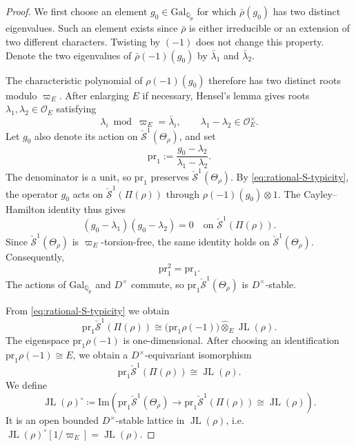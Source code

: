 \documentclass[11pt]{article}
\theoremstyle{definition}
\newcommand{\cO}{\mathcal O}
\newcommand{\JL}{\operatorname{JL}}
\begin{document}
\begin{proof}
We first choose an element $g_0\in\mathrm{Gal}_{\mathbb Q_p}$ for
which $\bar\rho(g_0)$ has two distinct eigenvalues.  Such an element exists since $\bar{\rho}$ is either irreducible or an extension of two different characters. 
Twisting by $(-1)$ does not change this property.  Denote
the two eigenvalues of $\bar\rho(-1)(g_0)$ by
$\bar\lambda_1$ and $\bar\lambda_2$.

The characteristic polynomial of $\rho(-1)(g_0)$ therefore has two
distinct roots modulo $\varpi_E$.  After enlarging $E$ if necessary,
Hensel's lemma gives roots $\lambda_1,\lambda_2\in\cO_E$ satisfying
\[
 \lambda_i\bmod\varpi_E=\bar\lambda_i,
 \qquad
 \lambda_1-\lambda_2\in\cO_E^\times.
\]
Let $g_0$ also denote its action on $\check{\mathcal S}^1(\Theta_\rho)$, and set
\[
 \mathrm{pr}_1:=\frac{g_0-\lambda_2}{\lambda_1-\lambda_2}.
\]
The denominator is a unit, so $\mathrm{pr}_1$ preserves
$\check{\mathcal S}^1(\Theta_\rho)$.  By \eqref{eq:rational-S-typicity}, the
operator $g_0$ acts on $\check{\mathcal S}^1(\Pi(\rho))$ through
$\rho(-1)(g_0)\otimes 1$.  The Cayley--Hamilton identity thus gives
\[
 (g_0-\lambda_1)(g_0-\lambda_2)=0
 \quad\text{on }\check{\mathcal S}^1(\Pi(\rho)).
\]
Since $\check{\mathcal S}^1(\Theta_\rho)$ is $\varpi_E$-torsion-free, the same
identity holds on $\check{\mathcal S}^1(\Theta_\rho)$.  Consequently,
\[
 \mathrm{pr}_1^2=\mathrm{pr}_1.
\]
The actions of $\mathrm{Gal}_{\mathbb Q_p}$ and $D^\times$ commute,
so $\mathrm{pr}_1\check{\mathcal S}^1(\Theta_\rho)$ is $D^\times$-stable.

From \eqref{eq:rational-S-typicity} we obtain
\[
 \mathrm{pr}_1\check{\mathcal S}^1(\Pi(\rho))
 \cong
 \bigl(\mathrm{pr}_1\rho(-1)\bigr)\widehat\otimes_E\JL(\rho).
\]
The eigenspace $\mathrm{pr}_1\rho(-1)$ is one-dimensional.  After choosing an
identification $\mathrm{pr}_1\rho(-1)\cong E$, we obtain a $D^\times$-equivariant
isomorphism
\[
 \mathrm{pr}_1\check{\mathcal S}^1(\Pi(\rho))\cong\JL(\rho).
\]
We define \[\JL(\rho)^\circ\coloneqq\mathrm{Im}(\mathrm{pr}_1\check{\mathcal S}^1(\Theta_\rho)\to \mathrm{pr}_1\check{\mathcal S}^1(\Pi(\rho))\cong\JL(\rho)).\]
It is an open
bounded $D^\times$-stable lattice in $\JL(\rho)$, i.e. $\JL(\rho)^\circ[1/\varpi_E]=\JL(\rho)$.


\end{proof}
\end{document}
